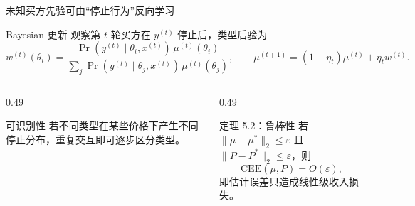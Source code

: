 \documentclass[10pt,aspectratio=169]{beamer}
\begin{document}
\begin{frame}{未知买方先验可由“停止行为”反向学习}
  \small
  \begin{block}{Bayesian 更新}
    观察第 $t$ 轮买方在 $y^{(t)}$ 停止后，类型后验为
    \[
      w^{(t)}(\theta_i)=
      \frac{\Pr(y^{(t)}\mid \theta_i,x^{(t)})\,\mu^{(t)}(\theta_i)}
      {\sum_j\Pr(y^{(t)}\mid \theta_j,x^{(t)})\,\mu^{(t)}(\theta_j)},
      \qquad
      \mu^{(t+1)}=(1-\eta_t)\mu^{(t)}+\eta_t w^{(t)}.
    \]
  \end{block}
  \begin{columns}[T,onlytextwidth]
    \begin{column}{0.49\textwidth}
      \begin{block}{可识别性}
        若不同类型在某些价格下产生不同停止分布，重复交互即可逐步区分类型。
      \end{block}
    \end{column}
    \begin{column}{0.49\textwidth}
      \begin{alertblock}{定理 5.2：鲁棒性}
        若 $\|\mu-\mu^*\|_2\le\varepsilon$ 且 $\|P-P^*\|_2\le\varepsilon$，则
        \[
          \mathrm{CEE}(\mu,P)=O(\varepsilon),
        \]
        即估计误差只造成线性级收入损失。
      \end{alertblock}
    \end{column}
  \end{columns}
\end{frame}
\end{document}
